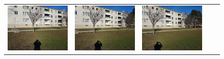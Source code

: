 \newlength \mywidth \setlength {}
\begin{figure}[h]
	\centering
	\begin{tabular}{ccccc}
	\includegraphics[width=\mywidth]{figures/seriesC_7.jpg} &
	\includegraphics[width=\mywidth]{figures/seriesC_6.jpg} &
	\includegraphics[width=\mywidth]{figures/seriesC_5.jpg} &

\end{tabular}
\end{figure}
